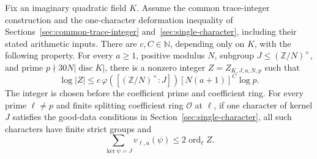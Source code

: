 \begin{srproposition}
\label{prop:sr-orbit-integer-implication}
Fix an imaginary quadratic field $K$. Assume the common trace-integer
construction and the one-character deformation inequality of
Sections~\ref{sec:common-trace-integer}
and~\ref{sec:single-character}, including their stated arithmetic inputs.
There are $c,C\in\mathbb N$, depending only on $K$, with the following
property. For every $a\ge1$, positive modulus $N$, subgroup
$J\le(\mathbb Z/N)^\times$, and prime
$p\nmid30N|\operatorname{disc}K|$, there is a nonzero integer
$Z=Z_{K,J,a,N,p}$ such that
\begin{equation}\label{eq:sr-orbit-integer-size}
 \log|Z|\le c\,\varphi([(\mathbb Z/N)^\times:J])
                    [N(a+1)]^C\log p.
\end{equation}
The integer is chosen before the coefficient prime and coefficient ring.
For every prime $\ell\ne p$ and finite splitting coefficient ring
$\mathcal O$ at $\ell$, if one character of kernel $J$ satisfies the
good-data conditions in Section~\ref{sec:single-character}, all such
characters have finite strict groups and
\begin{equation}\label{eq:sr-orbit-integer-valuations}
       \sum_{\ker\psi=J}v_{\ell,a}(\psi)
                              \le2\operatorname{ord}_\ell Z.
\end{equation}
\end{srproposition}
